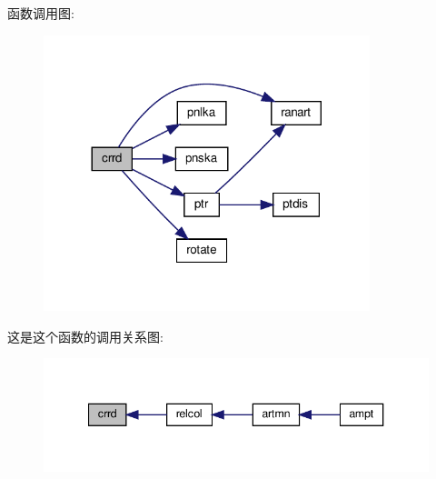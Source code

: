 函数调用图\+:
\nopagebreak
\begin{figure}[H]
\begin{center}
\leavevmode
\includegraphics[width=269pt]{crrd_8f90_ae95f678f16fd44590caca4e45695f820_cgraph}
\end{center}
\end{figure}
这是这个函数的调用关系图\+:
\nopagebreak
\begin{figure}[H]
\begin{center}
\leavevmode
\includegraphics[width=340pt]{crrd_8f90_ae95f678f16fd44590caca4e45695f820_icgraph}
\end{center}
\end{figure}
